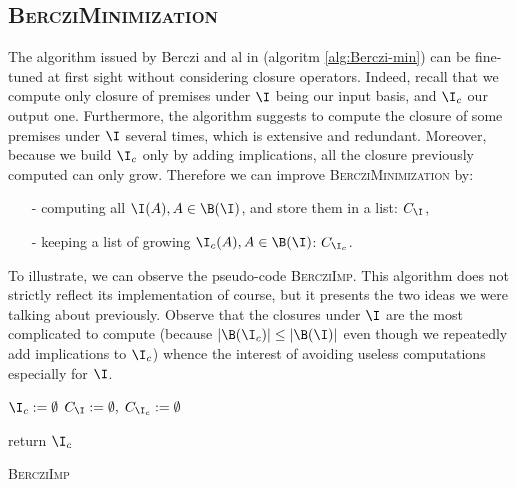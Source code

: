 \begin{figure}[H]
	
\end{figure}

\subsection{\textsc{BercziMinimization}}

The algorithm issued by Berczi and al in \cite{berczi_directed_2017} (algoritm \ref{alg:Berczi-min}) can be fine-tuned at first sight without considering closure operators. Indeed, recall that we compute only closure of premises under
$\I$ being our input basis, and $\I_c$ our output one. Furthermore, the algorithm suggests to compute the closure of some premises under $\I$ several 
times, which is extensive and redundant. Moreover, because we build $\I_c$ only by adding implications, all the closure previously computed can only grow.
Therefore we can improve \textsc{BercziMinimization} by:
\begin{itemize}
	\item[-] computing all $\I(A), A \in \B(\I)$, and store them in a list: $C_{\I}$,
	\item[-] keeping a list of growing $\I_c(A), A \in \B(\I)$: $C_{\I_c}$.
\end{itemize}
\noindent To illustrate, we can observe the pseudo-code \textsc{BercziImp}. This algorithm does not strictly reflect its implementation of course, but it
presents the two ideas we were talking about previously. Observe that the closures under $\I$ are the most complicated to compute (because $|\B(\I_c)| \leq |\B(\I)|$ even though we repeatedly add implications to $\I_c$) whence
the interest of avoiding useless computations especially for $\I$.

\begin{algorithm}
	
	\BlankLine
	\BlankLine
	
	$\I_c := \emptyset$ \;
	$C_{\I} := \emptyset, \; C_{\I_c} := \emptyset $ \;
	

	\BlankLine
	

	\BlankLine
	
	return $\I_c$ \;
	
	\caption{\textsc{BercziImp}}
	\label{alg:Berczi-imp}
\end{algorithm}

